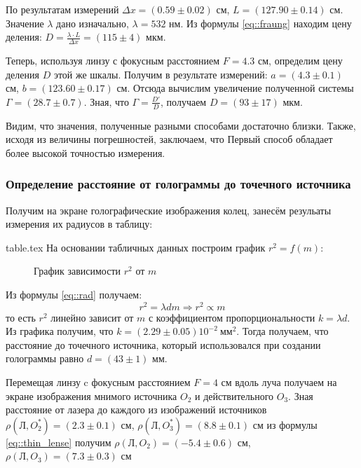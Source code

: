         По результатам измерений $\Delta x = (0.59 \pm 0.02)$ см, $L = (127.90 \pm 0.14)$ см.
        Значение $\lambda$ дано изначально, $\lambda = 532$ нм. 
        Из формулы \eqref{eq::fraung} находим цену деления: $D = \frac{\lambda \cdot L}{\Delta x} = (115 \pm 4)$ мкм.

        Теперь, используя линзу с фокусным расстоянием $F = 4.3$ см, определим 
        цену деления $D$ этой же шкалы. Получим в результате измерений:
        $a = (4.3 \pm 0.1)$ см, $b = (123.60 \pm 0.17)$ см.
        Отсюда вычислим увеличение полученной системы $\Gamma = (28.7 \pm 0.7)$.
        Зная, что $\Gamma = \frac{D'}{D}$, получаем $D = (93 \pm 17)$ мкм.

        Видим, что значения, полученные разными способами достаточно близки.
        Также, исходя из величины погрешностей, заключаем, что 
        Первый способ обладает более высокой точностью измерения.

    \subsubsection*{Определение расстояние от голограммы до точечного источника}

        Получим на экране голографические изображения колец, занесём резульаты 
        измерения их радиусов в таблицу:


        {table.tex}
        На основании табличных данных построим график $r^2 = f(m)$:
        \begin{figure}[h!]
            \caption{График зависимости $r^2$ от $m$}
        \end{figure}

        Из формулы \eqref{eq::rad} получаем:
        $$
        r^2 = \lambda d m \Rightarrow r^2 \propto m
        $$
        то есть $r^2$ линейно зависит от $m$ с коэффициентом пропорциональности
        $k = \lambda d$. Из графика получим, что $k = (2.29 \pm 0.05) 10^{-2} \: мм^2$.
        Тогда получаем, что расстояние до точечного источника, который 
        использовался при создании голограммы равно $d = (43 \pm 1)$ мм.

        Перемещая линзу c фокусным расстоянием $F = 4$ см 
        вдоль луча получаем на экране изображения мнимого источника $O_2$
        и действительного $O_3$. Зная расстояние от лазера до каждого из изображений источников 
        $\rho(\text{Л}, O_2^*) = (2.3 \pm 0.1)$ см,
        $\rho(\text{Л}, O_3^*) = (8.8 \pm 0.1)$ см из формулы \eqref{eq::thin_lense}
        получим $\rho(\text{Л}, O_2) = (-5.4 \pm 0.6)$ см,
        $\rho(\text{Л}, O_3) = (7.3 \pm 0.3)$ см

